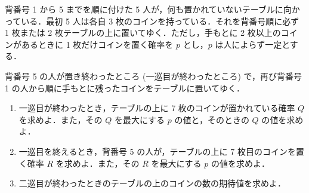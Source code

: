 \documentclass[../../main.tex]{subfiles}
\begin{document}
背番号 1 から 5 までを順に付けた 5 人が，何も置かれていないテーブルに向かっている．最初 5 人は各自 3 枚のコインを持っている．それを背番号順に必ず 1 枚または 2 枚テーブルの上に置いてゆく．ただし，手もとに 2 枚以上のコインがあるときに 1 枚だけコインを置く確率を $p$ とし，$p$ は人によらず一定とする．

背番号 5 の人が置き終わったところ (一巡目が終わったところ) で，再び背番号 1 の人から順に手もとに残ったコインをテーブルに置いてゆく．

\begin{enumerate}
  \item 一巡目が終わったとき，テーブルの上に 7 枚のコインが置かれている確率 $Q$ を求めよ．また，その $Q$ を最大にする $p$ の値と，そのときの $Q$ の値を求めよ．
  \item 一巡目を終えるとき，背番号 5 の人が，テーブルの上に 7 枚目のコインを置く確率 $R$ を求めよ．また，その $R$ を最大にする $p$ の値を求めよ．
  \item 二巡目が終わったときのテーブルの上のコインの数の期待値を求めよ．
\end{enumerate}
\end{document}
